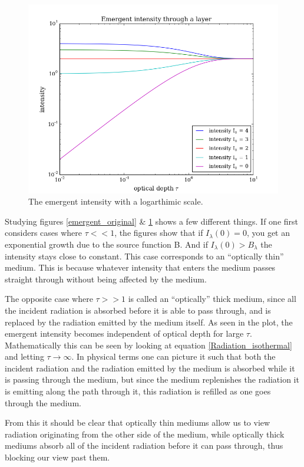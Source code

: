 \documentclass{aa}   %
\begin{document}
\begin{figure}
 \includegraphics[width=.49\textwidth]{emergent_log.png}
 \caption{The emergent intensity with a logarthimic scale.}
 \label{emergent_log}
\end{figure}
Studying figures \ref{emergent_original} \& \ref{emergent_log} shows a few different things.
If one first considers cases where $\tau << 1$, the figures show that if $I_\lambda(0) = 0$, you get an exponential growth due to the source function B. And if $I_\lambda(0) > B_\lambda$ the intensity stays close to constant. This case corresponds to an ``optically thin'' medium. This is because whatever intensity that enters the medium passes straight through without being affected by the medium.

The opposite case where $\tau >> 1$ is called an ``optically'' thick medium, since all the incident radiation is absorbed before it is able to pass through, and is replaced by the radiation emitted by the medium itself. As seen in the plot, the emergent intensity becomes independent of optical depth for large $\tau$. Mathematically this can be seen by looking at equation \ref{Radiation_isothermal} and letting $\tau \rightarrow \infty$. In physical terms one can picture it such that both the incident radiation and the radiation emitted by the medium is absorbed while it is passing through the medium, but since the medium replenishes the radiation it is emitting along the path through it, this radiation is refilled as one goes through the medium.

From this it should be clear that optically thin mediums allow us to view radiation originating from the other side of the medium, while optically thick mediums absorb all of the incident radiation before it can pass through, thus blocking our view past them.
\end{document}
